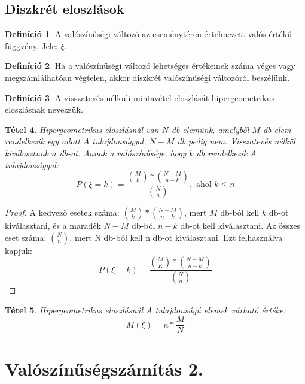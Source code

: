 \documentclass[twoside,12pt]{report}
\newtheorem{theorem}{Tétel}[section]
\theoremstyle{definition}
\newtheorem{definition}[theorem]{Definíció}
\begin{document}
\section{Diszkrét eloszlások}
	\begin{definition}
		A valószínűségi változó az eseménytéren értelmezett valós értékű függvény. Jele: $\xi$.
	\end{definition}
	\begin{definition}
		Ha a valószínűségi változó lehetséges értékeinek száma véges vagy megszámlálhatóan végtelen, akkor diszkrét valószínűségi változóról beszélünk.
	\end{definition}
	\begin{definition}
		A visszatevés nélküli mintavétel eloszlását hipergeometrikus eloszlásnak nevezzük.
	\end{definition}
	\begin{theorem}
		Hipergeometrikus eloszlásnál van $N$ db elemünk, amelyből $M$ db elem rendelkezik egy adott $A$ tulajdonsággal, $N-M$ db pedig nem. Visszatevés nélkül kiválasztunk $n$ db-ot. Annak a valószínűsége, hogy $k$ db rendelkezik $A$ tulajdonsággal:
		\begin{equation*}
			P(\xi=k)=\frac{\binom{M}{k}*\binom{N-M}{n-k}}{\binom{N}{n}},\text{ ahol }k\le n
		\end{equation*}
	\end{theorem}
	\begin{proof}
		A kedvező esetek száma: $\binom{M}{k}*\binom{N-M}{n-k}$, mert $M$ db-ból kell $k$ db-ot kiválasztani, és a maradék $N-M$ db-ból $n-k$ db-ot kell kiválasztani. Az összes eset száma: $\binom{N}{n}$, mert N db-ból kell n db-ot kiválasztani. Ezt felhasználva kapjuk: \begin{equation*}
			P(\xi=k)=\frac{\binom{M}{K}*\binom{N-M}{n-k}}{\binom{N}{n}}
		\end{equation*}
	\end{proof}
	\begin{theorem}
		Hipergeometrikus eloszlásnál $A$ tulajdonságú elemek várható értéke:
		\begin{equation*}
			M(\xi)=n*\frac{M}{N}
		\end{equation*}
	\end{theorem}
\chapter{Valószínűségszámítás 2.}
\end{document}
